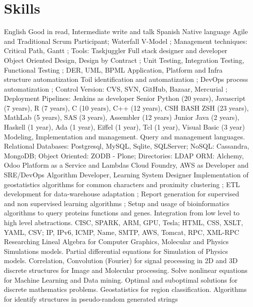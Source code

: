 \documentclass[9pt,a4paper,sans]{moderncv}
\begin{document}
\section{Skills}
        {English}
        {Good in read, Intermediate write and talk}
        {}
        {}
        {}
\cventry{}
        {Spanish}
        {Native language}
        {}
        {}
        {}
        {Agile and Traditional}
	{}
        {Scrum Participant; Waterfall V-Model ; Management techniques: Critical Path, Gantt ; Tools: Taskjuggler}
	{}
	{}
	{}
	{Full stack designer and developer}
        {Object Oriented Design, Design by Contract ; Unit Testing, Integration Testing, Functional Testing ; DER, UML, BPML}
        {}
        {}
        {}
        {}
        {Application, Platform and Infra structure automatization}
        {Toil identification and automatization ; DevOps process automatization ; Control Version: CVS, SVN, GitHub, Bazaar, Mercurial ; Deployment Pipelines: Jenkins as developer}
        {}
        {}
        {}
        {}
        {Senior}
        {Python (20 years), Javascript (7 years), R (7 years), C (10 years), C++ (12 years), CSH BASH ZSH (23 years), MathLab (5 years), SAS (3 years), Assembler (12 years)}
        {}
        {}
        {}
\cventry{}
        {Junior}
        {Java (2 years), Haskell (1 year), Ada (1 year), Eiffel (1 year), Tcl (1 year), Visual Basic (3 year)}
        {}
        {}
        {}
        {Modeling, Implementation and management. Query and management languages.}
        {Relational Databases: Postgresql, MySQL, Sqlite, SQLServer; NoSQL: Cassandra, MongoDB; Object Oriented: ZODB - Plone; Directories: LDAP}
        {ORM: Alchemy, Odoo}
        {}
        {}
        {Platform as a Service and Lambdas}
	{Cloud Foundry, AWS as Developer and SRE/DevOps}
        {}
        {}
        {}
	{Algorithm Developer, Learning System Designer}
	{Implementation of geostatistics algorithms for common characters and proximity clustering ; ETL development for data-warehouse adaptation ; Report generation for supervised and non supervised learning algorithms ; Setup and usage of bioinformatics algorithms to query proteins functions and genes. }
        {}
        {}
        {}
        {}
        {Integration from low level to high level abstractions.}
        {CISC, SPARK, ARM, GPU, Tesla; HTML, CSS, XSLT, YAML, CSV; IP, IPv6, ICMP, Name, SMTP, AWS, Tomcat, RPC, XML-RPC}
        {}
        {}
        {}
	{Researching}
	{Lineal Algebra for Computer Graphics, Molecular and Physics Simulations models. Partial differential equations for Simulation of Physics models. Correlation, Convolution (Fourier) for signal processing in 2D and 3D discrete structures for Image and Molecular processing. Solve nonlinear equations for Machine Learning and Data mining. Optimal and suboptimal solutions for discrete mathematics problems. Geostatistics for region classification. Algorithms for identify structures in pseudo-random generated strings}
	{}
	{}
	{}
\end{document}
